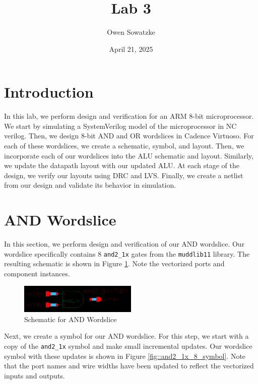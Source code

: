 \documentclass{article}
\title{Lab 3}
\author{Owen Sowatzke}
\date{April 21, 2025}
\newcommand{\zerodisplayskip}{
	\setlength{\abovedisplayskip}{0pt}%
	\setlength{\belowdisplayskip}{0pt}%
	\setlength{\abovedisplayshortskip}{0pt}%
	\setlength{\belowdisplayshortskip}{0pt}%
	\setlength{\mathindent}{0pt}}
\begin{document}
	\maketitle
	
	\section{Introduction}
	
	In this lab, we perform design and verification for an ARM 8-bit microprocessor. We start by simulating a SystemVerilog model of the microprocessor in NC verilog. Then, we design 8-bit AND and OR wordslices in Cadence Virtuoso. For each of these wordslices, we create a schematic, symbol, and layout. Then, we incorporate each of our wordslices into the ALU schematic and layout. Similarly, we update the datapath layout with our updated ALU. At each stage of the design, we verify our layouts using DRC and LVS. Finally, we create a netlist from our design and validate its behavior in simulation. 
	
	\section{AND Wordslice}
	\label{section::and_wordslice}
	
	In this section, we perform design and verification of our AND wordslice. Our wordslice specifically contains 8 \texttt{and2\_1x} gates from the \texttt{muddlib11} library. The resulting schematic is shown in Figure \ref{fig::and2_1x_8_schematic}. Note the vectorized ports and component instances.
	
	\begin{figure}[H]
		\centerline{\includegraphics[width=0.5\textwidth]{and2_1x_8_schematic.png}}
		\caption{Schematic for AND Wordslice}
		\label{fig::and2_1x_8_schematic}
	\end{figure}
	
	\noindent Next, we create a symbol for our AND wordslice. For this step, we start with a copy of the \texttt{and2\_1x} symbol and make small incremental updates. Our wordslice symbol with these updates is shown in Figure \ref{fig::and2_1x_8_symbol}. Note that the port names and wire widths have been updated to reflect the vectorized inputs and outputs.
	
\end{document}
